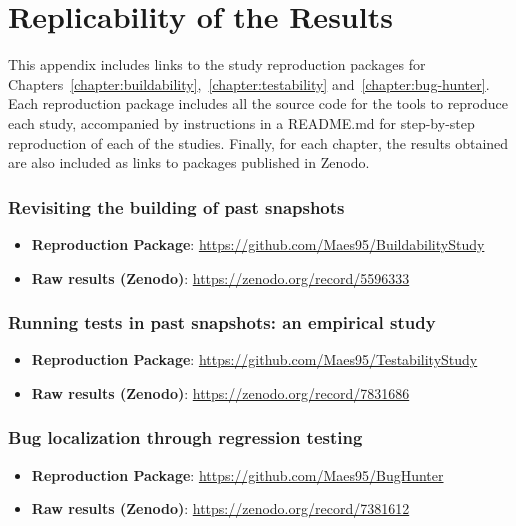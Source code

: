 \chapter{Replicability of the Results}
\label{appendix:replicability}

This appendix includes links to the study reproduction packages for Chapters~\ref{chapter:buildability},~\ref{chapter:testability} and~\ref{chapter:bug-hunter}. 
Each reproduction package includes all the source code for the tools to reproduce each study, accompanied by instructions in a README.md for step-by-step reproduction of each of the studies. 
Finally, for each chapter, the results obtained are also included as links to packages published in Zenodo.

\subsection*{Revisiting the building of past snapshots}
\label{sec:buildability:repro}

\begin{itemize}
    \item \textbf{Reproduction Package}: {\scriptsize \url{https://github.com/Maes95/BuildabilityStudy}}
    \item \textbf{Raw results (Zenodo)}: {\scriptsize \url{https://zenodo.org/record/5596333}}
\end{itemize}

\subsection*{Running tests in past snapshots: an empirical study}
\label{sec:testability:repro}

\begin{itemize}
    \item \textbf{Reproduction Package}: {\scriptsize \url{https://github.com/Maes95/TestabilityStudy}}
    \item \textbf{Raw results (Zenodo)}: {\scriptsize \url{https://zenodo.org/record/7831686}}
\end{itemize}

\subsection*{Bug localization through regression testing}
\label{sec:bug-hunter:repro}

\begin{itemize}
    \item \textbf{Reproduction Package}: {\scriptsize \url{https://github.com/Maes95/BugHunter}}
    \item \textbf{Raw results (Zenodo)}: {\scriptsize \url{https://zenodo.org/record/7381612}}
\end{itemize}